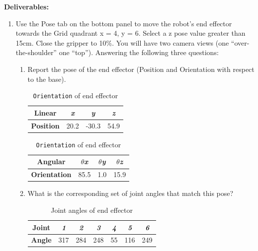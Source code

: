 \documentclass[12pt]{article}
\begin{document}
\textbf{Deliverables:}
\begin{enumerate}
    \item Use the Pose tab on the bottom panel to move the robot’s end effector towards the Grid quadrant x = 4, y = 6. Select a z pose value greater than 15cm. Close the gripper to 10\%. You will have two camera views (one “over-the-shoulder” one “top”). Answering the following three questions:
    \begin{enumerate}
    \item Report the pose of the end effector (Position and Orientation with respect to the base).
    
    \begin{table}[H]
        \caption{\texttt{Pose} information of end effector}
        \begin{subtable}{.5\linewidth}
            \centering
            \caption{\texttt{Position} of end effector in custom state}
            \begin{tabular}{cccc}
                \toprule
                \textbf{Linear} & \textit{x} & \textit{y} & \textit{z} \\\midrule
                \textbf{Position} & 20.2 & -30.3 & 54.9 \\\bottomrule
            \end{tabular}
        \end{subtable}
        \begin{subtable}{.5\linewidth}
            \centering
            \caption{\texttt{Orientation} of end effector}
            \begin{tabular}{cccc}
                \toprule
                \textbf{Angular} & \textit{$\theta$x} & \textit{$\theta$y} & \textit{$\theta$z} \\\midrule
                \textbf{Orientation} & 85.5 & 1.0 & 15.9 \\\bottomrule
            \end{tabular}
        \end{subtable}
    \end{table}

    \item What is the corresponding set of joint angles that match this pose?
    
    \begin{table}[H]
        \centering
        \caption{Joint angles of end effector}
        \begin{tabular}{ccccccc}
        \toprule
        \textbf{Joint} & \textit{1} & \textit{2} & \textit{3} & \textit{4} & \textit{5} & \textit{6} \\ \midrule
        \textbf{Angle} & 317        & 284        & 248        & 55         & 116        & 249        \\ \bottomrule
        \end{tabular}
    \end{table}


\end{enumerate}
\end{enumerate}
\end{document}
